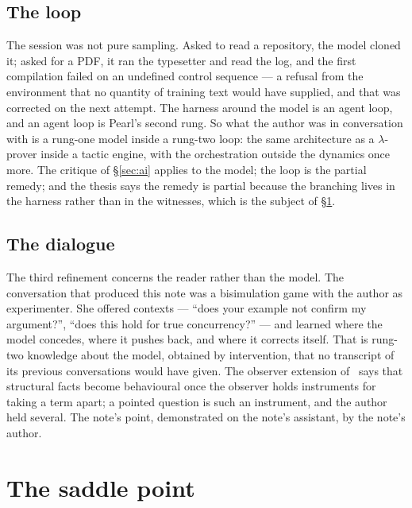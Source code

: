 \documentclass[11pt]{article}
\theoremstyle{plain}
\theoremstyle{definition}
\theoremstyle{remark}
\begin{document}
\subsection{The loop}

The session was not pure sampling. Asked to read a repository, the model
cloned it; asked for a PDF, it ran the typesetter and read the log, and the
first compilation failed on an undefined control sequence --- a refusal from
the environment that no quantity of training text would have supplied, and
that was corrected on the next attempt. The harness around the model is an
agent loop, and an agent loop is Pearl's second rung. So what the author was
in conversation with is a rung-one model inside a rung-two loop: the same
architecture as a $\lambda$-prover inside a tactic engine, with the
orchestration outside the dynamics once more. The critique of
\S\ref{sec:ai} applies to the model; the loop is the partial remedy; and the
thesis says the remedy is partial because the branching lives in the harness
rather than in the witnesses, which is the subject of \S\ref{sec:saddle}.

\subsection{The dialogue}

The third refinement concerns the reader rather than the model. The
conversation that produced this note was a bisimulation game with the author
as experimenter. She offered contexts --- ``does your example not confirm my
argument?'', ``does this hold for true concurrency?'' --- and learned where
the model concedes, where it pushes back, and where it corrects itself. That
is rung-two knowledge about the model, obtained by intervention, that no
transcript of its previous conversations would have given. The observer
extension of~\cite{Extension} says that structural facts become behavioural
once the observer holds instruments for taking a term apart; a pointed
question is such an instrument, and the author held several. The note's
point, demonstrated on the note's assistant, by the note's author.

\section{The saddle point}\label{sec:saddle}
\end{document}

